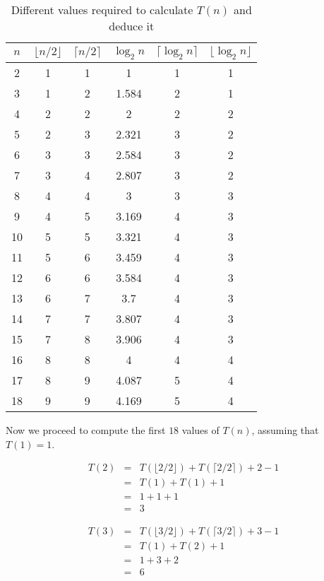 \documentclass[12pt]{scrartcl}
\begin{document}
\begin{enumerate}
	
	\begin{table}[ht!]
	\centering
	\caption{Different values required to calculate $T(n)$ and deduce it}
	\label{requiredValues}
	\begin{tabular}{|cccccc|}
	\hline
	$n$	&	$\lfloor n / 2 \rfloor$	&	$\lceil n / 2 \rceil$	&	$\log_2 n$		&	$\lceil \log_2 n \rceil$		&	$\lfloor \log_2 n \rfloor$
	\\
	\hline
	2	&			1		&		1			&		1		&		1				&		1			\\
	3	&			1		&		2			&		1.584	&		2				&		1			\\
	4	&			2		&		2			&		2		&		2				&		2			\\
	5	&			2		&		3			&		2.321	&		3				&		2			\\
	6	&			3		&		3			&		2.584	&		3				&		2			\\
	7	&			3		&		4			&		2.807	&		3				&		2			\\
	8	&			4		&		4			&		3		&		3				&		3			\\
	9	&			4		&		5			&		3.169	&		4				&		3			\\
	10	&			5		&		5			&		3.321	&		4				&		3			\\
	11	&			5		&		6			&		3.459	&		4				&		3			\\
	12	&			6		&		6			&		3.584	&		4				&		3			\\
	13	&			6		&		7			&		3.7		&		4				&		3			\\
	14	&			7		&		7			&		3.807	&		4				&		3			\\
	15	&			7		&		8			&		3.906	&		4				&		3			\\
	16	&			8		&		8			&		4		&		4				&		4			\\
	17	&			8		&		9			&		4.087	&		5				&		4			\\
	18	&			9		&		9			&		4.169	&		5				&		4			\\
	\hline
	\end{tabular}	
	\end{table}
	
	Now we proceed to compute the first $18$ values of $T(n)$, assuming that $T(1) = 1$.
	
	\begin{eqnarray}
		T(2)		&	=	&	T(\lfloor 2 / 2 \rfloor) + T(\lceil 2 / 2 \rceil) + 2 - 1 \nonumber \\
				&	=	&	T(1)	+	T(1)	+ 1  \nonumber \\
				&	=	&	1 + 1 + 1  \nonumber \\
				&	=	&	3   \nonumber 
	\end{eqnarray}
	
	\begin{eqnarray}
		T(3)		&	=	&	T(\lfloor 3 / 2 \rfloor) + T(\lceil 3 / 2 \rceil) + 3 - 1 \nonumber \\
				&	=	&	T(1)	+	T(2)	+ 1  \nonumber \\
				&	=	&	1 + 3 + 2  \nonumber \\
				&	=	&	6  \nonumber 
	\end{eqnarray}
	

\end{enumerate}
\end{document}
